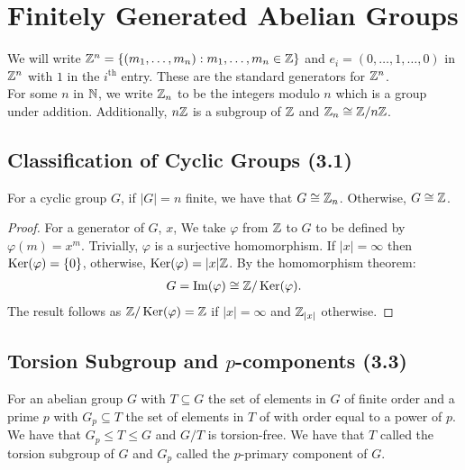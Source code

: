 \section{Finitely Generated Abelian Groups}

We will write $\mathbb{Z}^n = \{(m_1, \ldots, m_n) : m_1, \ldots, m_n \in \mathbb{Z}\}$
and $e_i = (0, \ldots, 1, \ldots, 0)$ in $\mathbb{Z}^n$ with $1$ in the 
$i^{\text{th}}$ entry. These are the standard generators for $\mathbb{Z}^n$.
\\[\baselineskip]
For some $n$ in $\mathbb{N}$, we write $\mathbb{Z}_n$ to be the integers
modulo $n$ which is a group under addition. Additionally, $n\mathbb{Z}$
is a subgroup of $\mathbb{Z}$ and $\mathbb{Z}_n \cong \mathbb{Z}/n\mathbb{Z}$.

\subsection{Classification of Cyclic Groups (3.1)} \label{3.1}

For a cyclic group $G$, if $|G| = n$ finite, we have that $G \cong \mathbb{Z}_n$.
Otherwise, $G \cong \mathbb{Z}$.

\begin{proof}
    For a generator of $G$, $x$, We take $\varphi$ from $\mathbb{Z}$ to $G$
    to be defined by $\varphi(m) = x^m$. Trivially, $\varphi$ is a
    surjective homomorphism. If $|x| = \infty$ then $\operatorname{Ker}(\varphi) = \{0\}$,
    otherwise, $\operatorname{Ker}(\varphi) = |x|\mathbb{Z}$. By the homomorphism theorem:
    \begin{align*}
        G = \operatorname{Im}(\varphi) \cong \mathbb{Z}/\operatorname{Ker}(\varphi).
    \end{align*} The result follows as $\mathbb{Z}/\operatorname{Ker}(\varphi) = \mathbb{Z}$
    if $|x| = \infty$ and $\mathbb{Z}_{|x|}$ otherwise.
\end{proof}

\subsection{Torsion Subgroup and $p$-components (3.3)} \label{3.3}

For an abelian group $G$ with $T \subseteq G$ the set of
elements in $G$ of finite order and a prime $p$ with
$G_p \subseteq T$ the set of elements in $T$ of with order
equal to a power of $p$. We have that $G_p \leq T \leq G$
and $G/T$ is torsion-free.
We have that $T$ called the torsion subgroup of $G$ and $G_p$ called
the $p$-primary component of $G$.


